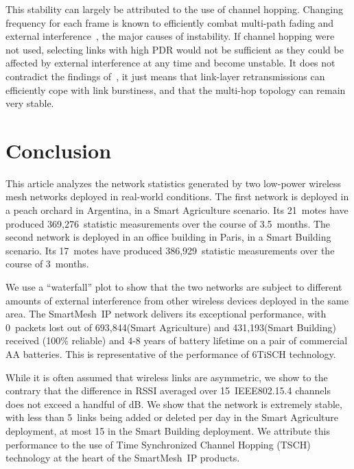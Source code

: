\documentclass{elsarticle}
\newcommand{\smip}                {SmartMesh~IP\xspace}
\newcommand{\building}            {Smart Building\xspace}
\newcommand{\agri}                {Smart Agriculture\xspace}
\newcommand{\PEACHNUMSTATS}       {369,276\xspace}
\newcommand{\PEACHNUMPCKTS}       {693,844\xspace}
\newcommand{\EVANUMSTATS}         {386,929\xspace}
\newcommand{\EVANUMPCKTS}         {431,193\xspace}
\begin{document}

This stability can largely be attributed to the use of channel hopping.
Changing frequency for each frame is known to efficiently combat multi-path fading and external interference~\cite{watteyne09reliability}, the major causes of instability.
If channel hopping were not used, selecting links with high PDR would not be sufficient as they could be affected by external interference at any time and become unstable.
It does not contradict the findings of~\cite{srinivasan08beta}, it just means that link-layer retransmissions can efficiently cope with link burstiness, and that the multi-hop topology can remain very stable.

\section{Conclusion}
\label{sec:conclusion}


This article analyzes the network statistics generated by two low-power wireless mesh networks deployed in real-world conditions.
The first network is deployed in a peach orchard in Argentina, in a \agri scenario.
Its 21~motes have produced \PEACHNUMSTATS~statistic measurements over the course of 3.5~months.
The second network is deployed in an office building in Paris, in a \building scenario.
Its 17~motes have produced \EVANUMSTATS~statistic measurements over the course of 3~months.


We use a ``waterfall'' plot to show that the two networks are subject to different amounts of external interference from other wireless devices deployed in the same area.
The \smip network delivers its exceptional performance, with 0~packets lost out of \PEACHNUMPCKTS (\agri) and \EVANUMPCKTS (\building) received (100\% reliable) and 4-8 years of battery lifetime on a pair of commercial AA batteries.
This is representative of the performance of 6TiSCH technology.


While it is often assumed that wireless links are asymmetric, we show to the contrary that the difference in RSSI averaged over 15~IEEE802.15.4 channels does not exceed a handful of dB.
We show that the network is extremely stable, with less than 5~links being added or deleted per day in the \agri deployment, at most 15 in the \building deployment.
We attribute this performance to the use of Time Synchronized Channel Hopping (TSCH) technology at the heart of the \smip products.
\end{document}
